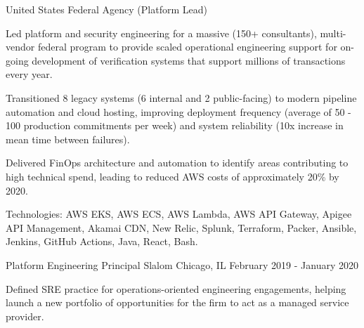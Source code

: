 \begin{cventries}
  \cventry
    {United States Federal Agency (Platform Lead)} %
    {} %
    {} %
    {} %
    {
      \begin{cvitems} %
        \item {Led platform and security engineering for a massive (150+ consultants), multi-vendor federal program to provide scaled operational engineering support for on-going development of verification systems that support millions of transactions every year.}
        \item {Transitioned 8 legacy systems (6 internal and 2 public-facing) to modern pipeline automation and cloud hosting, improving deployment frequency (average of 50 - 100 production commitments per week) and system reliability (10x increase in mean time between failures).}
        \item {Delivered FinOps architecture and automation to identify areas contributing to high technical spend, leading to reduced AWS costs of approximately 20\% by 2020.}
        \item {Technologies: AWS EKS, AWS ECS, AWS Lambda, AWS API Gateway, Apigee API Management, Akamai CDN, New Relic, Splunk, Terraform, Packer, Ansible, Jenkins, GitHub Actions, Java, React, Bash.}
      \end{cvitems}
    }

  \cventry
    {Platform Engineering Principal} %
    {Slalom} %
    {Chicago, IL} %
    {February 2019 - January 2020} %
    {
      \begin{cvitems} %
        \item {Defined SRE practice for operations-oriented engineering engagements, helping launch a new portfolio of opportunities for the firm to act as a managed service provider.}
      \end{cvitems}
    }


\end{cventries}
